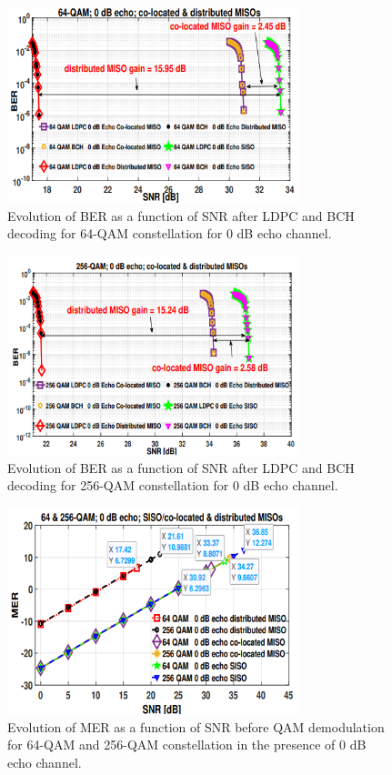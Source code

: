 \documentclass[10pt, conference]{IEEEtran}
\begin{document}
\begin{figure}[!htbp]
\centering
\includegraphics[width=8.5cm]{images/img5.png}
    \caption{Evolution of BER as a function of SNR after LDPC and BCH decoding for 64-QAM constellation for 0 dB echo channel.}
\end{figure}

\begin{figure}[!htbp]
\centering
\includegraphics[width=8.5cm]{images/img6.png}
    \caption{Evolution of BER as a function of SNR after LDPC and BCH decoding for 256-QAM constellation for 0 dB echo channel.}
\end{figure}


\begin{figure}[!htbp]
\centering
\includegraphics[width=8.5cm]{images/img7.png}
    \caption{Evolution of MER as a function of SNR before QAM demodulation for 64-QAM and 256-QAM constellation in the presence of 0 dB echo channel.}
\end{figure}
\end{document}

